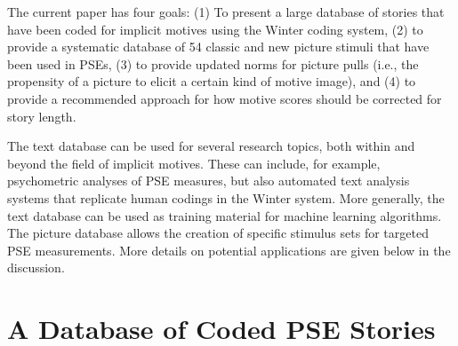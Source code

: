 \documentclass[man,a4paper,mask]{apa6}\usepackage[]{graphicx}\usepackage[]{color}
\begin{document}
The current paper has four goals: (1) To present a large database of stories that have been coded for implicit motives using the Winter coding system, (2) to provide a systematic database of 54 classic and new picture stimuli that have been used in PSEs, (3) to provide updated norms for picture pulls (i.e., the propensity of a picture to elicit a certain kind of motive image), and (4) to provide a recommended approach for how motive scores should be corrected for story length.

The text database can be used for several research topics, both within and beyond the field of implicit motives. These can include, for example, psychometric analyses of PSE measures, but also automated text analysis systems that replicate human codings in the Winter system. More generally, the text database can be used as training material for machine learning algorithms. The picture database allows the creation of specific stimulus sets for targeted PSE measurements. More details on potential applications are given below in the discussion.


\section{A Database of Coded PSE Stories}
\end{document}
